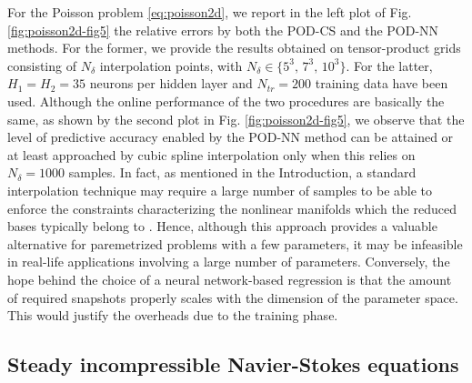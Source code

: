 \documentclass[longtitle]{elsarticle}
\numberwithin{equation}{section}
\theoremstyle{theorem}
\theoremstyle{definition}
\theoremstyle{remark}
\theoremstyle{proposition}
\numberwithin{figure}{section}
\begin{document}
		For the Poisson problem \eqref{eq:poisson2d}, we report in the left plot of Fig. \ref{fig:poisson2d-fig5} the relative errors by both the POD-CS and the POD-NN methods. For the former, we provide the results obtained on tensor-product grids consisting of $N_{\delta}$ interpolation points, with $N_{\delta} \in \lbrace 5^3, \, 7^3, \, 10^3 \rbrace$. For the latter, $H_1 = H_2 = 35$ neurons per hidden layer and $N_{tr} = 200$ training data have been used. Although the online performance of the two procedures are basically the same, as shown by the second plot in Fig. \ref{fig:poisson2d-fig5}, we observe that the level of predictive accuracy enabled by the POD-NN method can be attained or at least approached by cubic spline interpolation only when this relies on $N_{\delta} = 1000$ samples. In fact, as mentioned in the Introduction, a standard interpolation technique may require a large number of samples to be able to enforce the constraints characterizing the nonlinear manifolds which the reduced bases typically belong to \cite{Ams10}. Hence, although this approach provides a valuable alternative for paremetrized problems with a few parameters, it may be infeasible in real-life applications involving a large number of parameters. Conversely, the hope behind the choice of a neural network-based regression is that the amount of required snapshots properly scales with the dimension of the parameter space. This would justify the overheads due to the training phase.
		
		
		
		
	\subsection{Steady incompressible Navier-Stokes equations}
	\label{section:Steady incompressible Navier-Stokes equations}
	
\end{document}
